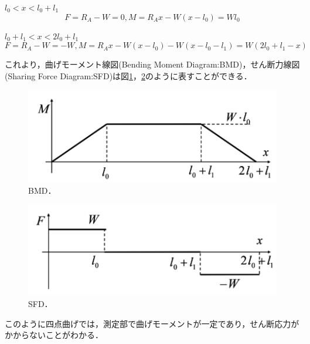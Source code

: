 $l_0<x<l_0 + l_1$
\begin{equation}
    F = R_A - W = 0, M = R_Ax - W(x - l_0) = Wl_0
\end{equation}

$l_0 + l_1<x<2l_0 + l_1$
\begin{equation}
    F = R_A - W = -W, M = R_Ax - W(x - l_0) - W(x - l_0 - l_1) = W(2l_0 + l_1 - x)
\end{equation}

これより，曲げモーメント線図(Bending Moment Diagram:BMD)，せん断力線図(Sharing Force Diagram:SFD)は図\ref{fig:BMD}，\ref{fig:SFD}のように表すことができる．
\begin{figure}[htbp]
    \centering %
    \includegraphics[width=100truemm,clip]{fig/fig_BMd}
    \caption{BMD．}
    \label{fig:BMD}
\end{figure}
\begin{figure}[htbp]
    \centering %
    \includegraphics[width=100truemm,clip]{fig/fig_SFD}
    \caption{SFD．}
    \label{fig:SFD}
\end{figure}
このように四点曲げでは，測定部で曲げモーメントが一定であり，せん断応力がかからないことがわかる．

